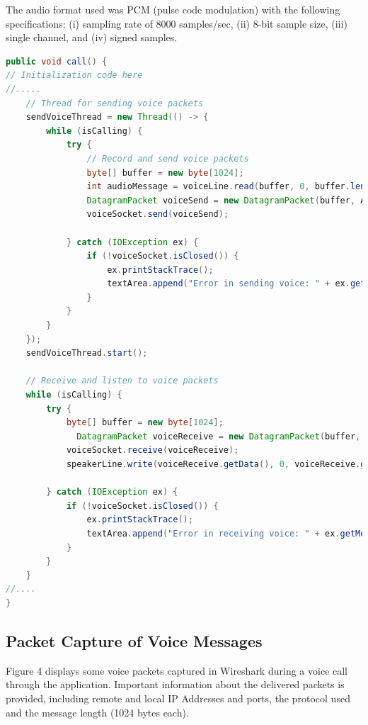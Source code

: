 \documentclass{article}
\begin{document}
The audio format used was PCM (pulse code modulation) with the following specifications: (i) sampling rate of 8000 samples/sec, (ii) 8-bit sample size, (iii) single channel, and (iv) signed samples.
\newline

\begin{lstlisting}[language=Java, caption={Voice call function}]
public void call() {
// Initialization code here
//.....
    // Thread for sending voice packets
    sendVoiceThread = new Thread(() -> {
        while (isCalling) {
            try {
                // Record and send voice packets
                byte[] buffer = new byte[1024];
                int audioMessage = voiceLine.read(buffer, 0, buffer.length);
                DatagramPacket voiceSend = new DatagramPacket(buffer, AudioMessage, remoteAddress, voiceRemotePort);
                voiceSocket.send(voiceSend);

            } catch (IOException ex) {
                if (!voiceSocket.isClosed()) {
                    ex.printStackTrace();
                    textArea.append("Error in sending voice: " + ex.getMessage() + "\n");
                }
            }
        }
    });
    sendVoiceThread.start();

    // Receive and listen to voice packets
    while (isCalling) {
        try {
            byte[] buffer = new byte[1024];
	          DatagramPacket voiceReceive = new DatagramPacket(buffer, buffer.length);
            voiceSocket.receive(voiceReceive);
            speakerLine.write(voiceReceive.getData(), 0, voiceReceive.getLength());
            
        } catch (IOException ex) {
            if (!voiceSocket.isClosed()) {
                ex.printStackTrace();
                textArea.append("Error in receiving voice: " + ex.getMessage() + "\n");
            }
        }
    }
//....
}
\end{lstlisting}

\subsection{Packet Capture of Voice Messages}
Figure 4 displays some voice packets captured in Wireshark during a voice call through the application. Important information about the delivered packets is provided, including remote and local IP Addresses and ports, the protocol used and the message length (1024 bytes each).
\newline
\end{document}
